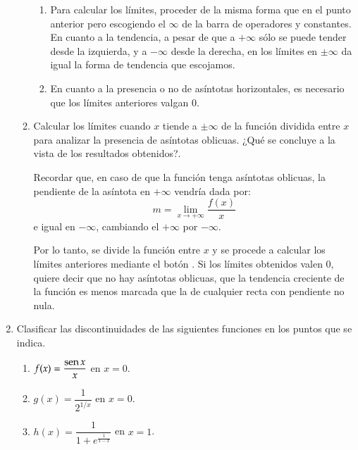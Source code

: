 \begin{enumerate}[leftmargin=*]
\begin{enumerate}
\begin{indicacion}
\begin{enumerate}
\item Para calcular los límites, proceder de la misma forma que en el punto anterior pero escogiendo el $\infty$ de la barra de operadores y
constantes. En cuanto a la tendencia, a pesar de que a $+\infty$ sólo se puede tender desde la izquierda, y a $-\infty$ desde la derecha, en
los límites en $\pm\infty$ da igual la forma de tendencia que escojamos.
\item En cuanto a la presencia o no de asíntotas horizontales, es necesario que los límites anteriores valgan 0.
\end{enumerate}
\end{indicacion}

\item Calcular los límites cuando $x$ tiende a $\pm\infty$ de la función dividida entre $x$ para analizar la presencia de asíntotas
oblicuas. ¿Qué se concluye a la vista de los resultados obtenidos?.
\begin{indicacion}
Recordar que, en caso de que la función tenga asíntotas oblicuas, la pendiente de la asíntota en $+\infty$ vendría dada por:
\[
m = \mathop {\lim }\limits_{x \to  + \infty } \frac{{f(x)}} {x}
\]
e igual en $-\infty$, cambiando el $+\infty$ por $-\infty$.

Por lo tanto, se divide la función entre $x$ y se procede a calcular los límites anteriores mediante el botón .
Si los límites obtenidos valen 0, quiere decir que no hay asíntotas oblicuas, que la tendencia creciente de la función es menos marcada que
la de cualquier recta con pendiente no nula.
\end{indicacion}
\end{enumerate}

\item  Clasificar las discontinuidades de las siguientes funciones en los puntos que se indica.
\begin{multicols}{2}
\begin{enumerate}
\item  $f(x)=\dfrac{\operatorname{sen} x}{x}$ en $x=0$.
\item $g(x)=\dfrac{1}{2^{1/x}}$ en $x=0$.
\item $h(x)=\dfrac{1}{1+e^{\frac{1}{1-x}}}$ en $x=1$.
\end{enumerate}
\end{multicols}


\end{enumerate}
